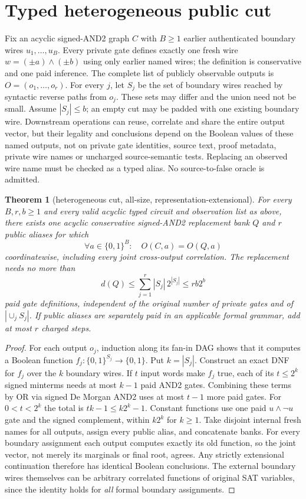 \documentclass[11pt]{article}
\newtheorem{theorem}{Theorem}
\begin{document}
\section*{Typed heterogeneous public cut}
\noindent Fix an acyclic signed-AND2 graph $C$ with $B\ge1$ earlier authenticated boundary wires $u_1,\dots,u_B$. Every private gate defines exactly one fresh wire $w=(\pm a)\wedge(\pm b)$ using only earlier named wires; the definition is conservative and one paid inference. The complete list of publicly observable outputs is $O=(o_1,\dots,o_r)$. For every $j$, let $S_j$ be the set of boundary wires reached by syntactic reverse paths from $o_j$. These sets may differ and the union need not be small. Assume $|S_j|\le b$; an empty cut may be padded with one existing boundary wire. Downstream operations can reuse, correlate and share the entire output vector, but their legality and conclusions depend on the Boolean values of these named outputs, not on private gate identities, source text, proof metadata, private wire names or uncharged source-semantic tests. Replacing an observed wire name must be checked as a typed alias. No source-to-false oracle is admitted.

\begin{theorem}[heterogeneous cut, all-size, representation-extensional]
For every $B,r,b\ge1$ and every valid acyclic typed circuit and observation list as above, there exists one acyclic conservative signed-AND2 replacement bank $Q$ and $r$ public aliases for which
$$
\forall a\in\{0,1\}^{B}:\quad O(C,a)=O(Q,a)
$$
coordinatewise, including every joint cross-output correlation. The replacement needs no more than
$$
d(Q)\le \sum_{j=1}^r |S_j|\,2^{|S_j|}\le r b2^b
$$
paid gate definitions, independent of the original number of private gates and of $|\cup_jS_j|$. If public aliases are separately paid in an applicable formal grammar, add at most $r$ charged steps.
\end{theorem}
\begin{proof}
For each output $o_j$, induction along its fan-in DAG shows that it computes a Boolean function $f_j:\{0,1\}^{S_j}\to\{0,1\}$. Put $k=|S_j|$. Construct an exact DNF for $f_j$ over the $k$ boundary wires. If $t$ input words make $f_j$ true, each of its $t\le2^k$ signed minterms needs at most $k-1$ paid AND2 gates. Combining these terms by OR via signed De Morgan AND2 uses at most $t-1$ more paid gates. For $0<t<2^k$ the total is $tk-1\le k2^k-1$. Constant functions use one paid $u\wedge\neg u$ gate and the signed complement, within $k2^k$ for $k\ge1$. Take disjoint internal fresh names for all outputs, assign every public alias, and concatenate banks. For every boundary assignment each output computes exactly its old function, so the joint vector, not merely its marginals or final root, agrees. Any strictly extensional continuation therefore has identical Boolean conclusions. The external boundary wires themselves can be arbitrary correlated functions of original SAT variables, since the identity holds for \emph{all} formal boundary assignments.
\end{proof}
\end{document}
